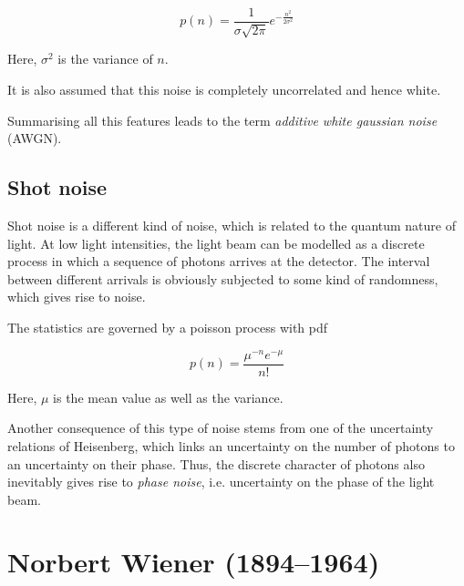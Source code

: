 \begin{equation}
p(n) = \frac{1}{\sigma \sqrt{2 \pi}} e^{-\frac{n^2}{2 \sigma^2}}
\end{equation} 

Here, $\sigma^2$ is the variance of $n$.

It is also assumed that this noise is completely uncorrelated and hence white.

Summarising all this features leads to the term \emph{additive white gaussian noise} (AWGN).

\subsection{Shot noise}

Shot noise is a different kind of noise, which is related to the quantum nature of light. At low light intensities, the light beam can be modelled as a discrete process in which a sequence of photons arrives at the detector. The interval between different arrivals is obviously subjected to some kind of randomness, which gives rise to noise.

The statistics are governed by a poisson process with pdf

\begin{equation}
p(n) = \frac{\mu^{-n}e^{-\mu}}{n!}
\end{equation}  

Here, $\mu$ is the mean value as well as the variance.

Another consequence of this type of noise stems from one of the uncertainty relations of Heisenberg, which links an uncertainty on the number of photons to an uncertainty on their phase. Thus, the discrete character of photons also inevitably gives rise to \emph{phase noise}, i.e. uncertainty on the phase of the light beam.

\pagebreak
\section*{Norbert Wiener (1894--1964)}


